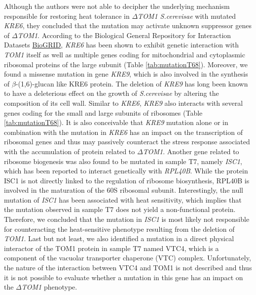 \documentclass[10pt,a4paper]{article}
\begin{document}
\noindent Although the authors were not able to decipher the underlying mechanism responsible for restoring heat tolerance in\textit{ $\Delta$TOM1 S.cerevisae} with mutated \textit{KRE6}, they concluded that the mutation may activate unknown suppressor genes of \textit{$\Delta$TOM1}. According to the Biological General Repository for Interaction Datasets \href{https://thebiogrid.org/}{BioGRID}, \textit{KRE6} has been shown to exhibit genetic interaction with \textit{TOM1} itself as well as multiple genes coding for mitochondrial and cytoplasmic ribosomal proteins of the large subunit (Table \ref{tab:mutationT68}). Moreover, we found a missense mutation in gene \textit{KRE9}, which is also involved in the synthesis of $\beta$-(1,6)-glucan like KRE6 protein. The deletion of \textit{KRE9}  has long been known to have a deleterious effect on the growth of \textit{S.cerevisae} by altering the composition of its cell wall\cite{brown_yeast_1993}. Similar to \textit{KRE6}, \textit{KRE9} also interacts with several genes coding for the small and large subunits of ribosomes (Table \ref{tab:mutationT68}). It is also conceivable that \textit{KRE9} mutation alone or in combination with the mutation in \textit{KRE6} has an impact on the transcription of ribosomal genes and thus may passively counteract the stress response associated with the accumulation of protein related to \textit{$\Delta$TOM1}. Another gene related to ribosome biogenesis was also found to be mutated in sample T7, namely \textit{ISC1}, which has been reported to interact genetically with \textit{RPL40B}\cite{hoppins_mitochondrial-focused_2011}. While the protein ISC1 is not directly linked to the regulation of ribosome biosynthesis, RPL40B is involved in the maturation of the 60S ribosomal subunit\cite{fernandez-pevida_yeast_2012}. Interestingly, the null mutation of \textit{ISC1} has been associated with heat sensitivity, which implies that the mutation observed in sample T7 does not yield a non-functional protein. Therefore, we concluded that the mutation in \textit{ISC1} is most likely not responsible for counteracting the heat-sensitive phenotype resulting from the deletion of \textit{TOM1}. Last but not least, we also identified a mutation in a direct physical interactor of the TOM1 protein in sample T7 named VTC4, which is a component of the vacuolar transporter chaperone (VTC) complex\cite{muller_role_2003}. Unfortunately, the nature of the interaction between VTC4 and TOM1 is not described and thus it is not possible to evaluate whether a mutation in this gene has an impact on the \textit{$\Delta$TOM1} phenotype.\\
 
\end{document}
